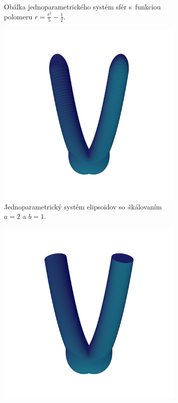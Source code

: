 \documentclass[12pt, twoside]{book}
\begin{document}
\begin{figure}[h]
\begin{subfigure}[t]{0.49\textwidth}
        	\caption{Obálka jednoparametrického systém sfér s~funkciou polomeru $r=\frac{t^2}{5}-\frac{1}{2}$.}
        \label{fig:plocha4}
    \end{subfigure}
    \begin{subfigure}[t]{0.49\textwidth}
        \centering
        \includegraphics[width=\textwidth, trim=0mm 50mm 0mm 50mm, clip=true]{images/bienert_ellipsoids.png}
		\caption{Jednoparametrický systém elipsoidov so~škálovaním $a=2$ a $b=1$.}
        \label{fig:plocha5}
    \end{subfigure}
    \hfill
    \begin{subfigure}[t]{0.49\textwidth}
        \centering
        \includegraphics[width=\textwidth, trim=0mm 50mm 0mm 50mm, clip=true]{images/bienert_ellipsoids_envelope.png}

\end{subfigure}
\end{figure}
\end{document}
